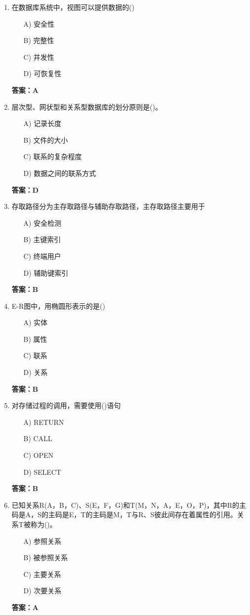 \documentclass[a4paper,12pt]{article}
\begin{document}
\begin{enumerate}[label=\arabic*.]
\item 在数据库系统中，视图可以提供数据的()
\begin{itemize}
    \item[A)] 安全性
    \item[B)] 完整性
    \item[C)] 并发性
    \item[D)] 可恢复性
\end{itemize}
\textbf{答案：A}

\item 层次型、网状型和关系型数据库的划分原则是()。
\begin{itemize}
    \item[A)] 记录长度
    \item[B)] 文件的大小
    \item[C)] 联系的复杂程度
    \item[D)] 数据之间的联系方式
\end{itemize}
\textbf{答案：D}

\item 存取路径分为主存取路径与辅助存取路径，主存取路径主要用于
\begin{itemize}
    \item[A)] 安全检测
    \item[B)] 主键索引
    \item[C)] 终端用户
    \item[D)] 辅助键索引
\end{itemize}
\textbf{答案：B}

\item E-R图中，用椭圆形表示的是()
\begin{itemize}
    \item[A)] 实体
    \item[B)] 属性
    \item[C)] 联系
    \item[D)] 关系
\end{itemize}
\textbf{答案：B}

\item 对存储过程的调用，需要使用()语句
\begin{itemize}
    \item[A)] RETURN
    \item[B)] CALL
    \item[C)] OPEN
    \item[D)] SELECT
\end{itemize}
\textbf{答案：B}

\item 已知关系R(A，B，C)、S(E，F，G)和T(M，N，A，E，O，P)，其中R的主码是A，S的主码是E，T的主码是M，T与R、S彼此间存在着属性的引用。关系T被称为()。
\begin{itemize}
    \item[A)] 参照关系
    \item[B)] 被参照关系
    \item[C)] 主要关系
    \item[D)] 次要关系
\end{itemize}
\textbf{答案：A}


\end{enumerate}
\end{document}
